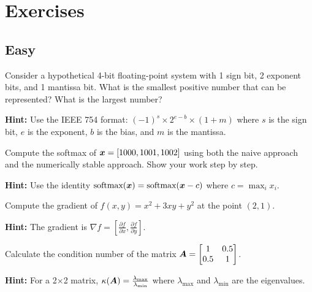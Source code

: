 
\section*{Exercises}

\subsection*{Easy}

\begin{problem}
\label{prob:float-basics}
Consider a hypothetical 4-bit floating-point system with 1 sign bit, 2 exponent bits, and 1 mantissa bit. What is the smallest positive number that can be represented? What is the largest number?

\textbf{Hint:} Use the IEEE 754 format: $(-1)^s \times 2^{e-b} \times (1 + m)$ where $s$ is the sign bit, $e$ is the exponent, $b$ is the bias, and $m$ is the mantissa.
\end{problem}

\begin{problem}
\label{prob:softmax-stability}
Compute the softmax of $\boldsymbol{x} = [1000, 1001, 1002]$ using both the naive approach and the numerically stable approach. Show your work step by step.

\textbf{Hint:} Use the identity $\text{softmax}(\boldsymbol{x}) = \text{softmax}(\boldsymbol{x} - c)$ where $c = \max_i x_i$.
\end{problem}

\begin{problem}
\label{prob:gradient-computation}
Compute the gradient of $f(x, y) = x^2 + 3xy + y^2$ at the point $(2, 1)$.

\textbf{Hint:} The gradient is $\nabla f = \left[\frac{\partial f}{\partial x}, \frac{\partial f}{\partial y}\right]$.
\end{problem}

\begin{problem}
\label{prob:condition-number}
Calculate the condition number of the matrix $\boldsymbol{A} = \begin{bmatrix} 1 & 0.5 \\ 0.5 & 1 \end{bmatrix}$.

\textbf{Hint:} For a 2×2 matrix, $\kappa(\boldsymbol{A}) = \frac{\lambda_{\max}}{\lambda_{\min}}$ where $\lambda_{\max}$ and $\lambda_{\min}$ are the eigenvalues.
\end{problem}

